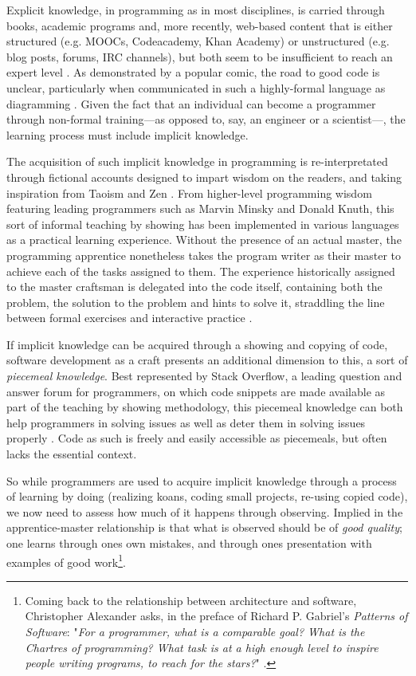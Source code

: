 Explicit knowledge, in programming as in most disciplines, is carried through books, academic programs and, more recently, web-based content that is either structured (e.g. MOOCs, Codeacademy, Khan Academy) or unstructured (e.g. blog posts, forums, IRC channels), but both seem to be insufficient to reach an expert level \citep{davies_models_1993}. As demonstrated by a popular comic, the road to good code is unclear, particularly when communicated in such a highly-formal language as diagramming \citep{munroe_good_2011}. Given the fact that an individual can become a programmer through non-formal training—as opposed to, say, an engineer or a scientist—, the learning process must include implicit knowledge.

The acquisition of such implicit knowledge in programming is re-interpretated through fictional accounts designed to impart wisdom on the readers, and taking inspiration from Taoism and Zen \citep{james_tao_1987,raymond_new_1996}. From higher-level programming wisdom featuring leading programmers such as Marvin Minsky and Donald Knuth, this sort of informal teaching by showing has been implemented in various languages as a practical learning experience. Without the presence of an actual master, the programming apprentice nonetheless takes the program writer as their master to achieve each of the tasks assigned to them. The experience historically assigned to the master craftsman is delegated into the code itself, containing both the problem, the solution to the problem and hints to solve it, straddling the line between formal exercises and interactive practice \citep{depaz_craft_2021}.

If implicit knowledge can be acquired through a showing and copying of code, software development as a craft presents an additional dimension to this, a sort of \emph{piecemeal knowledge}. Best represented by Stack Overflow, a leading question and answer forum for programmers, on which code snippets are made available as part of the teaching by showing methodology, this piecemeal knowledge can both help programmers in solving issues as well as deter them in solving issues properly \citep{treude_understanding_2017}. Code as such is freely and easily accessible as piecemeals, but often lacks the essential context.

So while programmers are used to acquire implicit knowledge through a process of learning by doing (realizing koans, coding small projects, re-using copied code), we now need to assess how much of it happens through observing. Implied in the apprentice-master relationship is that what is observed should be of \emph{good quality}; one learns through ones own mistakes, and through ones presentation with examples of good work\footnote{Coming back to the relationship between architecture and software, Christopher Alexander asks, in the preface of Richard P. Gabriel's \emph{Patterns of Software}: "\emph{For a programmer, what is a comparable goal? What is the Chartres of programming? What task is at a high enough level to inspire people writing programs, to reach for the stars?}" \citep{gabriel_patterns_1998}.}.

